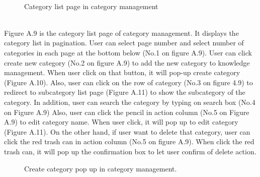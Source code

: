 \documentclass[12pt,oneside,openright,a4paper]{cpe-english-project}
\begin{document}
  \\
\begin{figure}[!h]\centering
{}
\caption{Category list page in category management
}\label{fig:Category list page in category management
}
\end{figure} \\
Figure A.9 is the category list page of category management. It displays the category
list in pagination. User can select page number and select number of categories in each page 
at the bottom below (No.1 on figure A.9).
User can click create new category (No.2 on figure A.9) to add the new category to 
knowledge management. When user click on that button, it will pop-up create category
(Figure A.10). Also, user can click on the row of category (No.3 on figure 4.9) to redirect to 
subcategory list page (Figure A.11) to show the subcategory of the category. In addition, 
user can search the category by typing on search box (No.4 on Figure A.9)
Also, user can click the pencil in action column (No.5 on Figure A.9) to edit category
name. When user click, it will pop up to edit category (Figure A.11). On the other hand, if 
user want to delete that category, user can click the red trash can in action column (No.5 on 
figure A.9). When click the red trash can, it will pop up the confirmation box to let user 
confirm of delete action.\\
\begin{figure}[!h]\centering
{}
\caption{Create category pop up in category management.
}\label{fig:Create category pop up in category management.
}
\end{figure}
\end{document}
